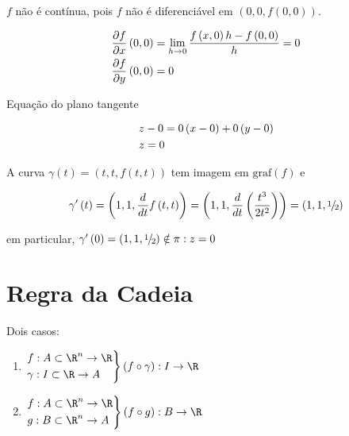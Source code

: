 \documentclass[11pt, oneside, a4paper]{gsm-l}
\begin{document}
\begin{sol}
    $f$ não é contínua, pois $f$ não é diferenciável em $\left( {0,0,f\left( {0,0} \right)} \right)$.

\[
\begin{gathered}
\frac{{\partial f}}
{{\partial x}}\left( {0,0} \right) = \mathop {\lim }\limits_{h \to 0} \frac{{f\left( {x,0} \right)h - f\left( {0,0} \right)}}
{h} = 0 \hfill \\
\frac{{\partial f}}
{{\partial y}}\left( {0,0} \right) = 0 \hfill \\
\end{gathered}
\]

Equação do plano tangente

\[
\begin{gathered}
z - 0 = 0\left( {x - 0} \right) + 0\left( {y - 0} \right) \hfill \\
z = 0 \hfill \\
\end{gathered}
\]

    A curva $\gamma \left( t \right) = \left( {t,t,f\left( {t,t} \right)} \right)$ tem imagem em ${\text{graf}}\left( f \right)$ e

\[
\gamma '\left( t \right) = \left( {1,1,\frac{d}
{{dt}}f\left( {t,t} \right)} \right) = \left( {1,1,\frac{d}
{{dt}}\left( {\frac{{t^3 }}
{{2t^2 }}} \right)} \right) = \left( {1,1,{\raise0.5ex\hbox{$\scriptstyle 1$}
\kern-0.1em/\kern-0.15em
\lower0.25ex\hbox{$\scriptstyle 2$}}} \right)
\]

    em particular, $\gamma '\left( 0 \right) = \left( {1,1,{\raise0.5ex\hbox{$\scriptstyle 1$}
\kern-0.1em/\kern-0.15em
\lower0.25ex\hbox{$\scriptstyle 2$}}} \right) \notin \pi :z = 0$
\end{sol}

\section{Regra da Cadeia}
\label{sec16}

Dois casos:

\begin{enumerate}
\item $\left. \begin{gathered}
f:A \subset \R^n  \to \R \hfill \\
\gamma :I \subset \R \to A \hfill \\
\end{gathered}  \right\}\left( {f \circ \gamma } \right):I \to \R$
\item $\left. \begin{gathered}
f:A \subset \R^n  \to \R \hfill \\
g:B \subset \R^n  \to A \hfill \\
\end{gathered}  \right\}\left( {f \circ g} \right):B \to \R$
\end{enumerate}
\end{document}
